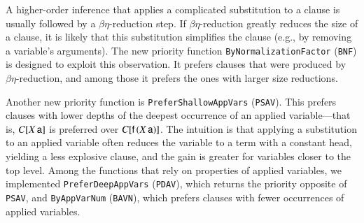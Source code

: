 A higher-order inference that applies a complicated substitution to a clause is
usually followed by a $\beta\eta$-reduction step. If
$\beta\eta$-reduction greatly reduces the size of a clause, it is likely
that this substitution simplifies the clause (e.g., by removing a variable's
arguments). The new priority function \verb|ByNormalizationFactor| (\verb|BNF|)
is designed to exploit this observation. It prefers clauses that were produced
by $\beta\eta$-reduction, and among those it prefers the ones with larger
size reductions.

Another new priority function is \verb|PreferShallowAppVars| (\verb|PSAV|). This
prefers clauses with lower depths of the deepest occurrence of an applied
variable---that is, $C[X \, \mathsf{a}]$ is preferred over $C[\mathsf{f}\,(X \,
\mathsf{a})]$. The intuition is that applying a substitution to an applied
variable often reduces the variable to a term with a constant head,
yielding a less explosive clause, and the gain is greater for variables closer
to the top level.  Among the functions that rely
on properties of applied variables, we implemented \verb|PreferDeepAppVars|
(\verb|PDAV|), which returns the priority opposite of \verb|PSAV|, and
\verb|ByAppVarNum| (\verb|BAVN|), which prefers clauses with fewer occurrences
of applied variables.



